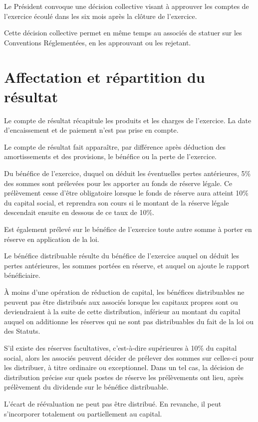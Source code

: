 \documentclass[a4paper,12pt]{report}
\begin{document}
Le Président convoque une décision collective visant à approuver les comptes de l'exercice écoulé dans les six mois après la clôture de l'exercice.

Cette décision collective permet en même temps au associés de statuer sur les Conventions Réglementées, en les approuvant ou les rejetant.

\section{Affectation et répartition du résultat}
Le compte de résultat récapitule les produits et les charges de l'exercice. La date d'encaissement et de paiement n'est pas prise en compte.

Le compte de résultat fait apparaître, par différence après déduction des amortissements et des provisions, le bénéfice ou la perte de l'exercice.

Du bénéfice de l'exercice, duquel on déduit les éventuelles pertes antérieures, 5\% des sommes sont prélevées pour les apporter au fonds de réserve légale. Ce prélèvement cesse d'être obligatoire lorsque le fonds de réserve aura atteint 10\% du capital social, et reprendra son cours si le montant de la réserve légale descendait ensuite en dessous de ce taux de 10\%.

Est également prélevé sur le bénéfice de l'exercice toute autre somme à porter en réserve en application de la loi.

Le bénéfice distribuable résulte du bénéfice de l'exercice auquel on déduit les pertes antérieures, les sommes portées en réserve, et auquel on ajoute le rapport bénéficiaire.

À moins d'une opération de réduction de capital, les bénéfices distribuables ne peuvent pas être distribués aux associés lorsque les capitaux propres sont ou deviendraient à la suite de cette distribution, inférieur au montant du capital auquel on additionne les réserves qui ne sont pas distribuables du fait de la loi ou des Statuts.

S'il existe des réserves facultatives, c'est-à-dire supérieures à 10\% du capital social, alors les associés peuvent décider de prélever des sommes sur celles-ci pour les distribuer, à titre ordinaire ou exceptionnel. Dans un tel cas, la décision de distribution précise sur quels postes de réserve les prélèvements ont lieu, après prélèvement du dividende sur le bénéfice distribuable.

L'écart de réévaluation ne peut pas être distribué. En revanche, il peut s'incorporer totalement ou partiellement au capital.
\end{document}
